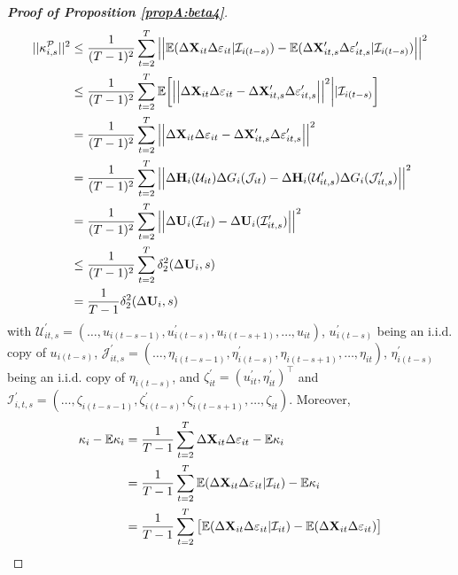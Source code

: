 \documentclass[a4paper,12pt]{article}
\begin{document}
\begin{proof}[\textnormal{\textbf{Proof of Proposition \ref{propA:beta4}}}]
{\color{black}\begin{align*}
||\kappa_{i, s}^{\mathcal{P}}||^2 &\leq \frac{1}{(T-1)^2} \sum_{t=2}^T \Big|\Big| \mathbb{E} (\Delta \mathbf{X}_{it}\Delta \varepsilon_{it}|\mathcal{I}_{i(t-s)}) -\mathbb{E} (\Delta \mathbf{X}_{it, s}^\prime\Delta \varepsilon_{it, s}^\prime|\mathcal{I}_{i(t-s)}) \Big|\Big|^2 \\
&\leq \frac{1}{(T-1)^2} \sum_{t=2}^T \mathbb{E} \bigg[ \Big|\Big| \Delta \mathbf{X}_{it}\Delta \varepsilon_{it} -\Delta \mathbf{X}_{it, s}^\prime\Delta \varepsilon_{it, s}^\prime\Big|\Big|^2\bigg| |\mathcal{I}_{i(t-s)}\bigg] \\
&= \frac{1}{(T-1)^2} \sum_{t=2}^T \Big|\Big| \Delta \mathbf{X}_{it}\Delta \varepsilon_{it} -\Delta \mathbf{X}_{it, s}^\prime\Delta \varepsilon_{it, s}^\prime\Big|\Big|^2 \\
& = \frac{1}{(T-1)^2} \sum_{t=2}^T \Big|\Big| \Delta \mathbf{H}_i(\mathcal{U}_{it})  \Delta G_i(\mathcal{J}_{it}) - \Delta \mathbf{H}_i(\mathcal{U}_{it, s}^\prime)  \Delta G_i(\mathcal{J}_{it, s}^\prime)\Big|\Big|^2\\
& = \frac{1}{(T-1)^2} \sum_{t=2}^T \Big|\Big| \Delta \mathbf{U}_i(\mathcal{I}_{it})  - \Delta \mathbf{U}_i(\mathcal{I}_{it, s}^\prime) \Big|\Big|^2 \\
& \leq \frac{1}{(T-1)^2} \sum_{t=2}^T \delta_2^2(\Delta \mathbf{U}_i, s)\\
& = \frac{1}{T-1}\delta_2^2(\Delta \mathbf{U}_i, s)
\end{align*}}
with $\mathcal{U}_{it, s}^\prime = (\ldots, u_{i(t-s-1)}, u^\prime_{i(t-s)}, u_{i(t-s+1)}, \ldots, u_{it})$, $u_{i(t-s)}^\prime$ being an i.i.d. copy of $u_{i(t-s)}$, $\mathcal{J}_{it, s}^\prime = (\ldots, \eta_{i(t-s-1)}, \eta^\prime_{i(t-s)}, \eta_{i(t-s+1)}, \ldots, \eta_{it})$, $\eta_{i(t-s)}^\prime$ being an i.i.d. copy of $\eta_{i(t-s)}$, and $\zeta^\prime_{it} = (u_{it}^\prime, \eta_{it}^\prime)^\top$ and $\mathcal{I}_{i,t,s}^\prime =(\ldots, \zeta_{i(t-s-1)}, \zeta^\prime_{i(t-s)}, \zeta_{i(t-s+1)}, \ldots, \zeta_{it})$.
Moreover,
\begin{align*}
\kappa_i - \ex \kappa_i &= \frac{1}{T-1}\sum_{t=2}^T \Delta \mathbf{X}_{it}\Delta \varepsilon_{it} - \ex \kappa_i \\
&= \frac{1}{T-1}\sum_{t=2}^T \ex ( \Delta \mathbf{X}_{it}\Delta \varepsilon_{it}|\mathcal{I}_{it}) - \ex \kappa_i \\
&= \frac{1}{T-1}\sum_{t=2}^T \big[ \ex ( \Delta \mathbf{X}_{it}\Delta \varepsilon_{it}|\mathcal{I}_{it} ) - \ex ( \Delta\mathbf{X}_{it}\Delta \varepsilon_{it}) \big] \\

\end{align*}
\end{proof}
\end{document}
